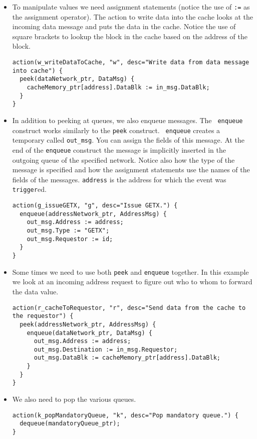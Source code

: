 \documentclass[11pt]{article}
\begin{document}
\begin{itemize}

\item
To manipulate values we need assignment statements (notice the use of
{\verb+:=+} as the assignment operator).  The action to write data
into the cache looks at the incoming data message and puts the data in
the cache.  Notice the use of square brackets to lookup the block in
the cache based on the address of the block.

\begin{verbatim}
action(w_writeDataToCache, "w", desc="Write data from data message into cache") {
  peek(dataNetwork_ptr, DataMsg) {
    cacheMemory_ptr[address].DataBlk := in_msg.DataBlk;
  }
}
\end{verbatim}

\item
In addition to peeking at queues, we also enqueue messages.  The {\tt
enqueue} construct works similarly to the {\tt peek} construct.  {\tt
enqueue} creates a temporary called {\tt out\_msg}.  You can assign
the fields of this message.  At the end of the {\tt enqueue} construct
the message is implicitly inserted in the outgoing queue of the
specified network.  Notice also how the type of the message is
specified and how the assignment statements use the names of the
fields of the messages.  {\tt address} is the address for which the
event was {\tt trigger}ed.

\begin{verbatim}
action(g_issueGETX, "g", desc="Issue GETX.") {
  enqueue(addressNetwork_ptr, AddressMsg) {
    out_msg.Address := address;
    out_msg.Type := "GETX";
    out_msg.Requestor := id;
  }
}
\end{verbatim}

\item
Some times we need to use both {\tt peek} and {\tt enqueue} together.
In this example we look at an incoming address request to figure out
who to whom to forward the data value.

\begin{verbatim}
action(r_cacheToRequestor, "r", desc="Send data from the cache to the requestor") {
  peek(addressNetwork_ptr, AddressMsg) {
    enqueue(dataNetwork_ptr, DataMsg) {
      out_msg.Address := address;
      out_msg.Destination := in_msg.Requestor;
      out_msg.DataBlk := cacheMemory_ptr[address].DataBlk;
    }
  }
}
\end{verbatim}

\item
We also need to pop the various queues.
\begin{verbatim}
action(k_popMandatoryQueue, "k", desc="Pop mandatory queue.") {
  dequeue(mandatoryQueue_ptr);
}
\end{verbatim}


\end{itemize}
\end{document}
